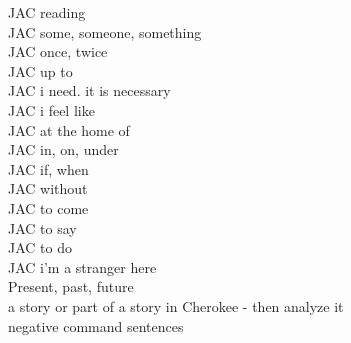 \begin{multicols}
JAC reading\\
JAC some, someone, something\\
JAC once, twice\\
JAC up to\\
JAC i need. it is necessary\\
JAC i feel like\\
JAC at the home of\\
JAC in, on, under\\
JAC if, when\\
JAC without\\
JAC to come\\
JAC to say\\
JAC to do\\
JAC i'm a stranger here\\
Present, past, future\\
a story or part of a story in Cherokee - then analyze it\\
negative command sentences\\

\end{multicols}
